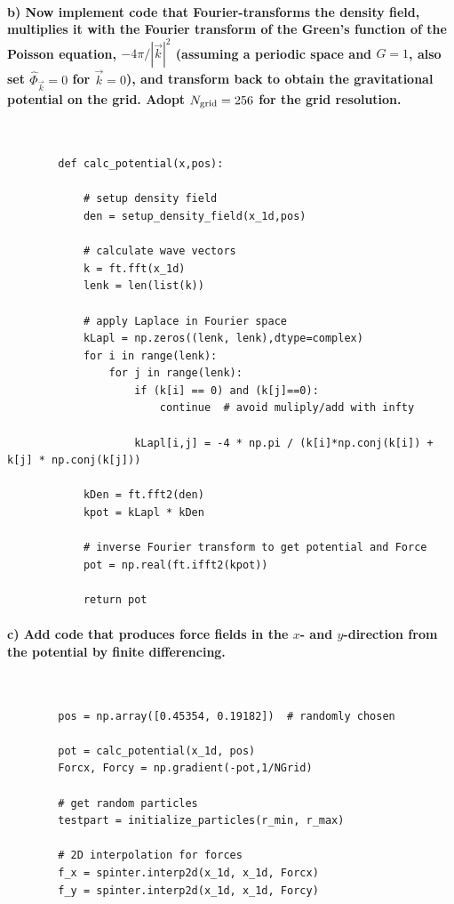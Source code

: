 \paragraph{b) Now implement code that Fourier-transforms the density field, 
    multiplies it with the Fourier transform of the Green's function of the 
    Poisson equation, $-4\pi/|\vec k|^2$ (assuming a periodic space and 
    $G=1$, also set $\hat{\Phi}_{\vec k}=0$ for $\vec k=0$), and transform back 
    to obtain the gravitational potential on the grid. Adopt 
    $N_\textnormal{grid}=256$ for the grid resolution.
} \ \\
    \begin{lstlisting}
        def calc_potential(x,pos):

            # setup density field
            den = setup_density_field(x_1d,pos)

            # calculate wave vectors
            k = ft.fft(x_1d)
            lenk = len(list(k))

            # apply Laplace in Fourier space
            kLapl = np.zeros((lenk, lenk),dtype=complex)
            for i in range(lenk):
                for j in range(lenk):
                    if (k[i] == 0) and (k[j]==0):
                        continue  # avoid muliply/add with infty

                    kLapl[i,j] = -4 * np.pi / (k[i]*np.conj(k[i]) + k[j] * np.conj(k[j]))

            kDen = ft.fft2(den)
            kpot = kLapl * kDen

            # inverse Fourier transform to get potential and Force
            pot = np.real(ft.ifft2(kpot))

            return pot\end{lstlisting}

\paragraph{c) Add code that produces force fields in the $x$- and 
    $y$-direction from the potential by finite differencing.
} \ \\
    \begin{lstlisting}
        pos = np.array([0.45354, 0.19182])  # randomly chosen

        pot = calc_potential(x_1d, pos)
        Forcx, Forcy = np.gradient(-pot,1/NGrid)

        # get random particles
        testpart = initialize_particles(r_min, r_max)

        # 2D interpolation for forces
        f_x = spinter.interp2d(x_1d, x_1d, Forcx)
        f_y = spinter.interp2d(x_1d, x_1d, Forcy)\end{lstlisting}

